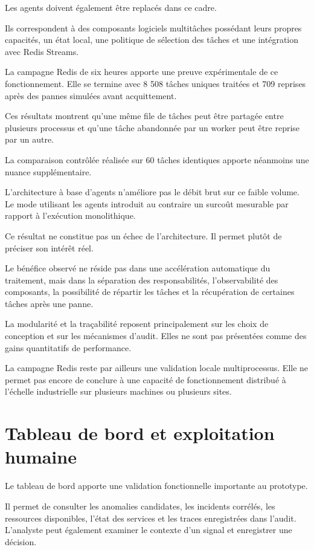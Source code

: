 Les agents doivent également être replacés dans ce cadre.

Ils correspondent à des composants logiciels multitâches possédant leurs propres capacités, un état local, une politique de sélection des tâches et une intégration avec Redis Streams.

La campagne Redis de six heures apporte une preuve expérimentale de ce fonctionnement. Elle se termine avec 8 508 tâches uniques traitées et 709 reprises après des pannes simulées avant acquittement.

Ces résultats montrent qu'une même file de tâches peut être partagée entre plusieurs processus et qu'une tâche abandonnée par un worker peut être reprise par un autre.

La comparaison contrôlée réalisée sur 60 tâches identiques apporte néanmoins une nuance supplémentaire.

L'architecture à base d'agents n'améliore pas le débit brut sur ce faible volume. Le mode utilisant les agents introduit au contraire un surcoût mesurable par rapport à l'exécution monolithique.

Ce résultat ne constitue pas un échec de l'architecture. Il permet plutôt de préciser son intérêt réel.

Le bénéfice observé ne réside pas dans une accélération automatique du traitement, mais dans la séparation des responsabilités, l'observabilité des composants, la possibilité de répartir les tâches et la récupération de certaines tâches après une panne.

La modularité et la traçabilité reposent principalement sur les choix de conception et sur les mécanismes d'audit. Elles ne sont pas présentées comme des gains quantitatifs de performance.

La campagne Redis reste par ailleurs une validation locale multiprocessus. Elle ne permet pas encore de conclure à une capacité de fonctionnement distribué à l'échelle industrielle sur plusieurs machines ou plusieurs sites.

\section{Tableau de bord et exploitation humaine}

Le tableau de bord apporte une validation fonctionnelle importante au prototype.

Il permet de consulter les anomalies candidates, les incidents corrélés, les ressources disponibles, l'état des services et les traces enregistrées dans l'audit. L'analyste peut également examiner le contexte d'un signal et enregistrer une décision.


